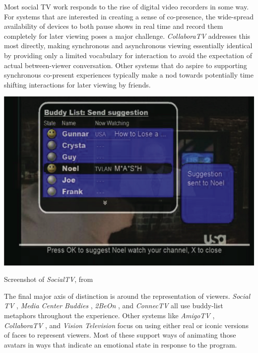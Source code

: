 Most social TV work responds to the rise of digital video recorders in some way. For systems that are interested in creating a sense of co-presence, the wide-spread availability of devices to both pause shows in real time and record them completely for later viewing poses a major challenge. \emph{CollaboraTV} \citep{harrison2007collaboratv} addresses this most directly, making synchronous and asynchronous viewing essentially identical by providing only a limited vocabulary for interaction to avoid the expectation of actual between-viewer conversation. Other systems that do aspire to supporting synchronous co-present experiences typically make a nod towards potentially time shifting interactions for later viewing by friends.

\begin{marginfigure}
	\includegraphics{figures/roar/socialTV.png}
	\caption{Screenshot of \emph{SocialTV}, from \citep{uses.socialTV}}
	\label{fig:socialTV}
\end{marginfigure}


The final major axis of distinction is around the representation of viewers. \emph{Social TV} \citep{harboe2007perceptions}, \emph{Media Center Buddies} \citep{regan2004media}, \emph{2BeOn} \citep{abreu20022beon}, and \emph{ConnecTV} \citep{boertjes2008connectv} all use buddy-list metaphors throughout the experience. Other systems like \emph{AmigoTV} \citep{coppens2004amigotv}, \emph{CollaboraTV}  \citep{harrison2007collaboratv}, and \emph{Vision Television} \citep{vt} focus on using either real or iconic versions of faces to represent viewers. Most of these support ways of animating those avatars in ways that indicate an emotional state in response to the program.

